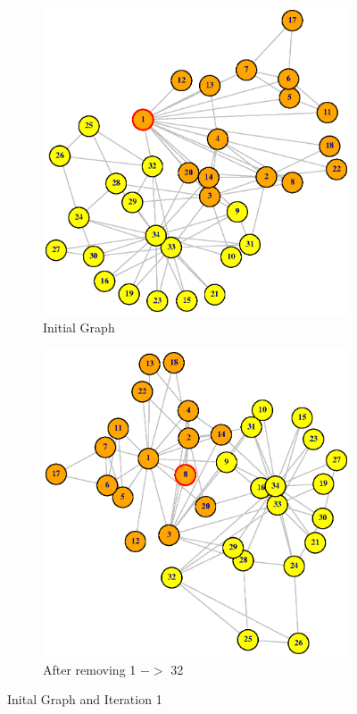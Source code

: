 \documentclass[12pt,letterpaper]{article}
\begin{document}
\begin{figure}[ht!]
\centering
\begin{subfigure}{.5\textwidth}
  \centering
  \includegraphics[width=.9\linewidth]{Plot1}
  \caption{Initial Graph}
  \label{fig:sub1}
\end{subfigure}%
\begin{subfigure}{.5\textwidth}
  \centering
  \includegraphics[width=.9\linewidth]{Plot2}
  \caption{After removing 1 $->$ 32}
  \label{fig:sub2}
\end{subfigure}
\caption{Inital Graph and Iteration 1}
\label{fig:test}
\end{figure}
\end{document}
